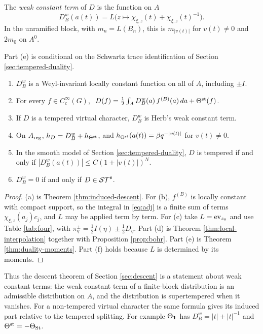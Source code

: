 \begin{definition}\label{def:wct}
The \emph{weak constant term} of $D$ is the function on $A$
\[
D^w_B(a(t))=L\bigl(z\mapsto\chi_{\xi,z}(t)+\chi_{\xi,z}(t)^{-1}\bigr).
\]
In the unramified block, with $m_n=L(B_n)$, this is $m_{|v(t)|}$ for $v(t)\ne0$ and $2m_0$ on $A^0$.
\end{definition}

\begin{theorem}\label{thm:decomp}
Part (e) is conditional on the Schwartz trace identification of Section \ref{sec:tempered-duality}.
\begin{enumerate}[label=(\alph*),leftmargin=*]
\item $D^w_B$ is a Weyl-invariant locally constant function on all of $A$, including $\pm I$.
\item For every $f\in C_c^\infty(G)$, $\ D(f)=\tfrac12\int_AD^w_B(a)\,f^{(B)}(a)\,da+\Theta^{\rm st}(f)$.
\item If $D$ is a tempered virtual character, $D^w_B$ is Herb's weak constant term.
\item On $A_{\rm reg}$, $h_D=D^w_B+h_{\Theta^{\rm st}}$, and $h_{\Theta^{\rm st}}(a(t))=\beta q^{-|v(t)|}$ for $v(t)\ne0$.
\item In the smooth model of Section \ref{sec:tempered-duality}, $D$ is tempered if and only if $|D^w_B(a(t))|\le C(1+|v(t)|)^N$.
\item $D^w_B=0$ if and only if $D\in\mathcal{ST}^{\mathfrak s}$.
\end{enumerate}
\end{theorem}
\begin{proof}
(a) is Theorem \ref{thm:induced-descent}. For (b), $f^{(B)}$ is locally constant with compact support, so the integral in \eqref{eq:adj} is a finite sum of terms $\chi_{\xi,z}(a_j)c_j$, and $L$ may be applied term by term. For (c) take $L=\operatorname{ev}_{z_0}$ and use Table \ref{tab:four}, with $\pi_\eta^\pm=\tfrac12I(\eta)\pm\tfrac12D_\eta$. Part (d) is Theorem \ref{thm:local-interpolation} together with Proposition \ref{prop:bohr}. Part (e) is Theorem \ref{thm:duality-moments}. Part (f) holds because $L$ is determined by its moments.
\end{proof}
Thus the descent theorem of Section \ref{sec:descent} is a statement about weak constant terms: the weak constant term of a finite-block distribution is an admissible distribution on $A$, and the distribution is supertempered when it vanishes. For a non-tempered virtual character the same formula gives its induced part relative to the tempered splitting. For example $\Theta_{\mathbf 1}$ has $D^w_B=|t|+|t|^{-1}$ and $\Theta^{\rm st}=-\Theta_{\operatorname{St}}$.

